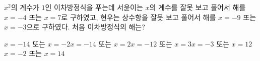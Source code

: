 $x^2$의 계수가 $1$인 이차방정식을 푸는데 서윤이는 $x$의 계수를 잘못 보고 풀어서 해를 $x=-4$ 또는 $x=7$로 구하였고, 현우는 상수항을 잘못 보고 풀어서 해를 $x=-9$ 또는 $x=-3$으로 구하였다. 처음 이차방정식의 해는?
\begin{choicesv}{$x=-14$ 또는 $x=-2$}{$x=-14$ 또는 $x=2$}{$x=-12$ 또는 $x=3$}{$x=-3$ 또는 $x=12$}{$x=-2$ 또는 $x=14$}\end{choicesv}
